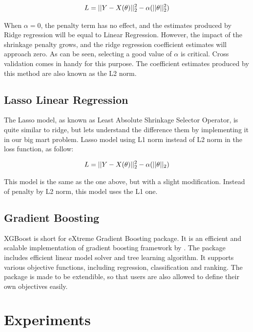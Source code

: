 \documentclass[11pt,a4paper]{article}
\begin{document}
\begin{equation}
\label{eq: ridge}
L = ||Y - X(\theta)||_2^2 - \alpha(||\theta||_2^2)\\
\end{equation}

When \(\alpha=0\), the penalty term has no eﬀect, and the estimates produced by Ridge regression will be equal to Linear Regression. However, the impact of the shrinkage penalty grows, and the ridge regression coefficient estimates will approach zero. As can be seen, selecting a good value of \(\alpha\) is critical. Cross validation comes in handy for this purpose. The coefficient estimates produced by this method are also known as the L2 norm.

\subsection{Lasso Linear Regression}
 The Lasso model, as known as Least Absolute Shrinkage Selector Operator, is quite similar to ridge, but lets understand the difference them by implementing it in our big mart problem. Lasso model using L1 norm instead of L2 norm in the loss function, as follow:

\begin{equation}
\label{eq: lasso}
L = ||Y - X(\theta)||_2^2 - \alpha(||\theta||_2)\\
\end{equation}

This model is the same as the one above, but with a slight modification. Instead of penalty by L2 norm, this model uses the L1 one.

\subsection{Gradient Boosting}

XGBoost is short for eXtreme Gradient Boosting package. It is an efficient and scalable
implementation of gradient boosting framework by \citet{chen2016xgboost}.
The package includes efficient linear model solver and tree learning algorithm. It supports various
objective functions, including regression, classification and ranking. The package is made to be
extendible, so that users are also allowed to define their own objectives easily. 

\section{Experiments}
\end{document}
